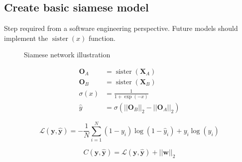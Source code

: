\subsection{Create basic siamese model}
\begin{frame}{\insertsubsec}
  Step required from a software engineering perspective. Future models should implement the 
  \( \operatorname{sister}(x) \) function.
  \begin{figure}
    \scalebox{.7}{}
    \caption{Siamese network illustration}
  \end{figure}
\end{frame}
\begin{frame}
  \begin{align*}
    \bm{O}_A &= \operatorname{sister}(\bm{X}_A) \\
    \bm{O}_B &= \operatorname{sister}(\bm{X}_B) \\
    \sigma(x) &= \frac{1}{1 + \exp(-x)} \\
    \hat{y} &= \sigma(||\bm{O}_B||_2 - ||\bm{O}_A||_2) 
  \end{align*}

  \[
    \mathcal{L}(\bm{y}, \hat{\bm{y}}) = -\frac{1}{N} \sum_{i = 1}^{N}
    (1 - y_i)\log(1 - \hat{y}_i) + y_i\log(\hat{y}_i)
  \]

  \[
    C(\bm{y}, \hat{\bm{y}}) = \mathcal{L}(\bm{y}, \hat{\bm{y}}) + 
    ||\bm{w}||_2
  \]
\end{frame}

